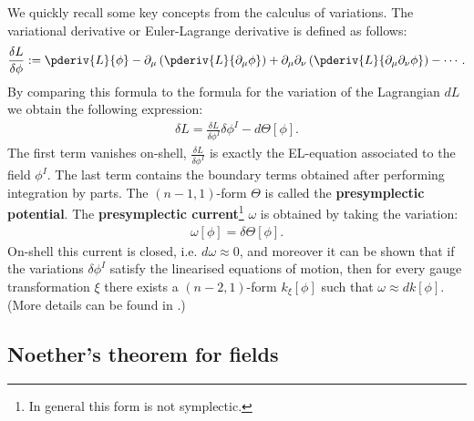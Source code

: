     We quickly recall some key concepts from the calculus of variations. The variational derivative or Euler-Lagrange derivative is defined as follows:
    \begin{gather}
        \frac{\delta L}{\delta \phi} := \pderiv{L}{\phi} - \partial_\mu\left(\pderiv{L}{\partial_\mu\phi}\right) + \partial_\mu\partial_\nu\left(\pderiv{L}{\partial_\mu\partial_\nu\phi}\right) -\cdots.
    \end{gather}
    By comparing this formula to the formula for the variation of the Lagrangian $dL$ we obtain the following expression:
    \begin{gather}
        \delta L = \frac{\delta L}{\delta \phi^I}\delta\phi^I - d\Theta[\phi].
    \end{gather}
    The first term vanishes on-shell, $\frac{\delta L}{\delta \phi^I}$ is exactly the EL-equation associated to the field $\phi^I$. The last term contains the boundary terms obtained after performing integration by parts. The $(n-1, 1)$-form $\Theta$ is called the \textbf{presymplectic potential}. The \textbf{presymplectic current}\footnote{In general this form is not symplectic.} $\omega$ is obtained by taking the variation:
    \begin{gather}
        \omega[\phi] = \delta\Theta[\phi].
    \end{gather}
    On-shell this current is closed, i.e. $d\omega\approx0$, and moreover it can be shown that if the variations $\delta\phi^I$ satisfy the linearised equations of motion, then for every gauge transformation $\xi$ there exists a $(n-2, 1)$-form $k_\xi[\phi]$ such that $\omega\approx dk[\phi]$. (More details can be found in \cite{compere}.)

\subsection{Noether's theorem for fields}

